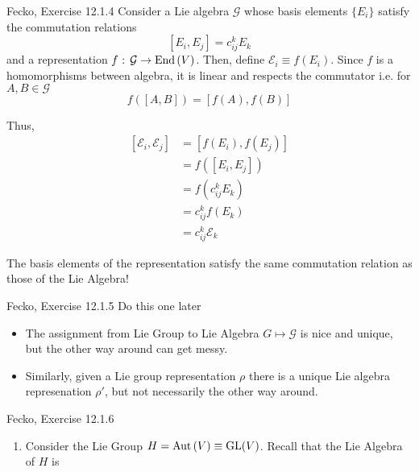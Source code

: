 \documentclass[11pt]{article}
\begin{document}
\begin{ex}{Fecko, Exercise 12.1.4}
    Consider a Lie algebra $\mathcal{G}$ whose basis elements $\{E_i\}$ satisfy the commutation relations 
    \[ [E_i, E_j] = c^k_{ij} E_k  \]
    and a representation $f \text{ : } \mathcal{G} \rightarrow \mathrm{End}\left(V\right)$. Then, define $\mathcal{E}_i \equiv f(E_i)$. Since $f$ is a homomorphisms between algebra, it is linear and respects the commutator i.e. for $A, B \in \mathcal{G}$
    \[ f\left( [A, B] \right) = \left[f(A), f(B)\right] \] 

    Thus, 
    \begin{align*}
      \left[ \mathcal{E}_i, \mathcal{E}_j \right] &= \left[f(E_i), f(E_j) \right] \\
      &= f\left([E_i, E_j]\right) \\
      &= f\left(c^k_{ij} E_k\right) \\
      &= c^{k}_{ij} f(E_k) \\
      &= c^{k}_{ij} \mathcal{E}_k 
    \end{align*}

    \begin{thought}{The basis elements of the representation satisfy the same commutation relation as those of the Lie Algebra!}
    \end{thought}
\end{ex}

\begin{ex}{Fecko, Exercise 12.1.5}
    Do this one later
\end{ex}

\vskip 0.5cm
\begin{itemize}
  \item The assignment from Lie Group to Lie Algebra $G \mapsto \mathcal{G}$ is nice and unique, but the other way around can get messy.
  \item Similarly, given a Lie group representation $\rho$ there is a unique Lie algebra represenation $\rho'$, but not necessarily the other way around. 
\end{itemize}


\begin{ex}{Fecko, Exercise 12.1.6}
  \begin{enumerate}[label=(\roman*)]
    \item Consider the Lie Group $H = \mathrm{Aut}\left(V\right) \equiv \mathrm{GL}(V)$. 
    Recall that the Lie Algebra of $H$ is 
  \end{enumerate}
\end{ex}
\end{document}
